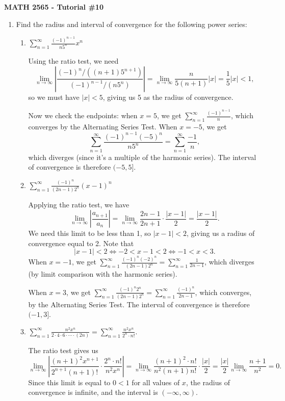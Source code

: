 \documentclass[12pt]{article}
\newcommand{\di}{\displaystyle}
\newcommand{\abs}[1]{\left\lvert #1\right\rvert}
\begin{document}
\author{Instructor: Sean Fitzpatrick}
\thispagestyle{empty}
\begin{center}
{\bf MATH 2565 - Tutorial \#10}
\end{center}



 \begin{enumerate}
\item Find the radius and interval of convergence for the following power series:
\begin{enumerate}
\item $\di\sum_{n=1}^\infty\frac{(-1)^{n-1}}{n5^n}x^n$

Using the ratio test, we need
\[
\lim_{n\to\infty}\abs{\frac{(-1)^n/((n+1)5^{n+1})}{(-1)^{n-1}/(n5^n)}} = \lim_{n\to\infty}\frac{n}{5(n+1)}\abs{x} = \frac{1}{5}\abs{x}<1,
\]
so we must have $\abs{x}<5$, giving us 5 as the radius of convergence.

Now we check the endpoints: when $x=5$, we get $\di \sum_{n=1}^\infty \frac{(-1)^{n-1}}{n}$, which converges by the Alternating Series Test. When $x=-5$, we get 
\[
\sum_{n=1}^\infty \frac{(-1)^{n-1}(-5)^n}{n5^n} = \sum_{n=1}^\infty \frac{-1}{n},
\]
which diverges (since it's a multiple of the harmonic series). The interval of convergence is therefore $(-5,5]$.

\item $\di\sum_{n=1}^\infty\frac{(-1)^n}{(2n-1)2^n}(x-1)^n$

Applying the ratio test, we have
\[
\lim_{n\to\infty} \abs{\frac{a_{n+1}}{a_n}} = \lim_{n\to\infty}\frac{2n-1}{2n+1}\cdot\frac{\abs{x-1}}{2} = \frac{\abs{x-1}}{2}.
\]
We need this limit to be less than 1, so $\abs{x-1}<2$, giving us a radius of convergence equal to 2. Note that
\[
\abs{x-1}<2 \Leftrightarrow -2<x-1<2 \Leftrightarrow -1<x<3.
\]
When $x=-1$, we get $\di\sum_{n=1}^\infty \frac{(-1)^n(-2)^n}{(2n-1)2^n} = \sum_{n=1}^\infty\frac{1}{2n-1}$, which diverges (by limit comparison with the harmonic series).

When $x=3$, we get $\di\sum_{n=1}^\infty \frac{(-1)^n2^n}{(2n-1)2^n}=\sum_{n=1}^\infty \frac{(-1)^n}{2n-1}$, which converges, by the Alternating Series Test. The interval of convergence is therefore $(-1,3]$.

\item $\di\sum_{n=1}^\infty\frac{n^2x^n}{2\cdot 4\cdot 6\cdot\cdots\cdot (2n)} = \sum_{n=1}^\infty \frac{n^2x^n}{2^n\cdot n!}$.

The ratio test gives us
\[
\lim_{n\to\infty}\abs{\frac{(n+1)^2x^{n+1}}{2^{n+1}(n+1)!}\cdot \frac{2^n \cdot n!}{n^2 x^n}} = \lim_{n\to\infty}\frac{(n+1)^2\cdot n!}{n^2(n+1)n!}\cdot\frac{\abs{x}}{2} = \frac{\abs{x}}{2}\lim_{n\to\infty}\frac{n+1}{n^2} = 0.
\]
Since this limit is equal to $0<1$ for all values of $x$, the radius of convergence is infinite, and the interval is $(-\infty,\infty)$.



\end{enumerate}
\end{enumerate}
\end{document}
